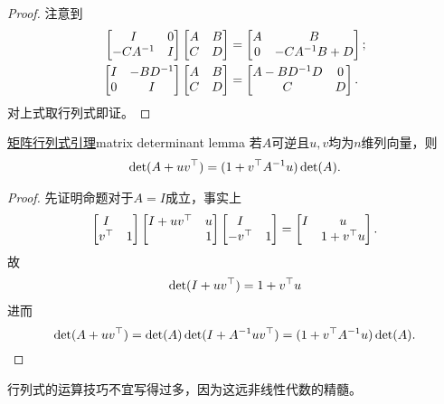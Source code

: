 \begin{proof}
	注意到
	\begin{align*}
		\begin{bmatrix}
			I&0\\-CA^{-1}&I
		\end{bmatrix}
		\begin{bmatrix}
			A&B\\C&D
		\end{bmatrix}&=
		\begin{bmatrix}
			A&B\\0&-CA^{-1} B+D
		\end{bmatrix};\\
		\begin{bmatrix}
			I&-BD^{-1}\\0&I
		\end{bmatrix}
		\begin{bmatrix}
			A&B\\C&D
		\end{bmatrix}&=
		\begin{bmatrix}
			A-BD^{-1} D&0\\C&D
		\end{bmatrix}.
	\end{align*}
	对上式取行列式即证。
\end{proof}
\begin{theorem}{\href{https://en.wikipedia.org/wiki/Matrix_determinant_lemma}{矩阵行列式引理}}{matrix determinant lemma}
	若$A$可逆且$u,v$均为$n$维列向量，则
	\begin{align}
		\det(A+uv^\top)=(1+v^\top A^{-1} u)\det(A).
	\end{align}
\end{theorem}
\begin{proof}
	先证明命题对于$A=I$成立，事实上
	\begin{align*}
		\begin{bmatrix}
			I\\v^\top&1
		\end{bmatrix}
		\begin{bmatrix}
			I+uv^\top&u\\ &1
		\end{bmatrix}
		\begin{bmatrix}
			I\\-v^\top&1
		\end{bmatrix}=
		\begin{bmatrix}
			I&u\\ &1+v^\top u
		\end{bmatrix}.
	\end{align*}
	故
	\begin{align}
		\det(I+uv^\top)=1+v^\top u
	\end{align}
	进而 
	\[
		\det(A+uv^\top)=\det(A)\det(I+A^{-1} uv^\top)=(1+v^\top A^{-1} u)\det(A).
	\]
\end{proof}
行列式的运算技巧不宜写得过多，因为这远非线性代数的精髓。
